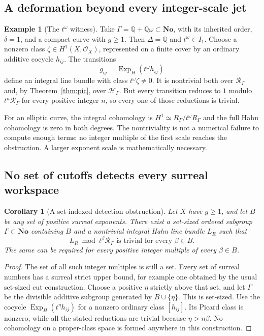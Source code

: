 \documentclass[11pt,letterpaper]{article}
\numberwithin{equation}{section}
\newtheorem{corollary}[theorem]{Corollary}
\theoremstyle{definition}
\newtheorem{example}[theorem]{Example}
\theoremstyle{remark}
\newcommand{\Q}{\mathbb Q}
\newcommand{\No}{\mathbf{No}}
\newcommand{\HH}{\mathcal H}
\newcommand{\RR}{\mathcal R}
\newcommand{\OO}{\mathcal O}
\newcommand{\Exp}{\operatorname{Exp}_{H}}
\newcommand{\Hg}{\HH_\Gamma}
\newcommand{\Rg}{\RR_\Gamma}
\newcommand{\rg}{R_\Gamma}
\begin{document}
\subsection{A deformation beyond every integer-scale jet}
\begin{example}[The $t^\omega$ witness]
\label{ex:invisible}
Take $\Gamma=\Q+\Q\omega\subset\No$, with its inherited order,
$\delta=1$, and a compact curve with $g\ge1$. Then
$\Delta=\Q$ and $t^\omega\in I_1$.
Choose a nonzero class $\zeta\in H^1(X,\OO_X)$, represented on a finite
cover by an ordinary additive cocycle $h_{ij}$. The transitions
\begin{equation}
 g_{ij}=\Exp(t^\omega h_{ij})
 \label{eq:invisiblebundle}
\end{equation}
define an integral line bundle with class $t^\omega\zeta\ne0$.
It is nontrivial both over $\Rg$ and, by Theorem~\ref{thm:pic},
over $\Hg$. But every transition reduces to $1$ modulo $t^n\Rg$
for every positive integer $n$, so every one of those reductions is
trivial.

For an elliptic curve, the integral cohomology is
$H^1\simeq\rg/t^\omega\rg$ and the full Hahn cohomology is zero in
both degrees. The nontriviality is not a numerical failure to compute
enough terms: no integer multiple of the first scale reaches the
obstruction. A larger exponent scale is mathematically necessary.
\end{example}

\subsection{No set of cutoffs detects every surreal workspace}
\begin{corollary}[A set-indexed detection obstruction]
\label{cor:setcutoffs}
Let $X$ have $g\ge1$, and let $B$ be any set of positive surreal
exponents. There exist a set-sized ordered subgroup
$\Gamma\subset\No$ containing $B$ and a nontrivial integral Hahn line
bundle $L_R$ such that
\[
 L_R\bmod t^\beta\Rg\text{ is trivial for every }\beta\in B.
\]
The same can be required for every positive integer multiple of every
$\beta\in B$.
\end{corollary}
\begin{proof}
The set of all such integer multiples is still a set. Every set of
surreal numbers has a surreal strict upper bound, for example one
obtained by the usual set-sized cut construction. Choose a positive
$\eta$ strictly above that set, and let $\Gamma$ be the divisible
additive subgroup generated by $B\cup\{\eta\}$. This is set-sized.
Use the cocycle $\Exp(t^\eta h_{ij})$ for a nonzero ordinary class
$[h_{ij}]$. Its Picard class is nonzero, while all the stated
reductions are trivial because $\eta>n\beta$. No cohomology on a
proper-class space is formed anywhere in this construction.
\end{proof}
\end{document}
